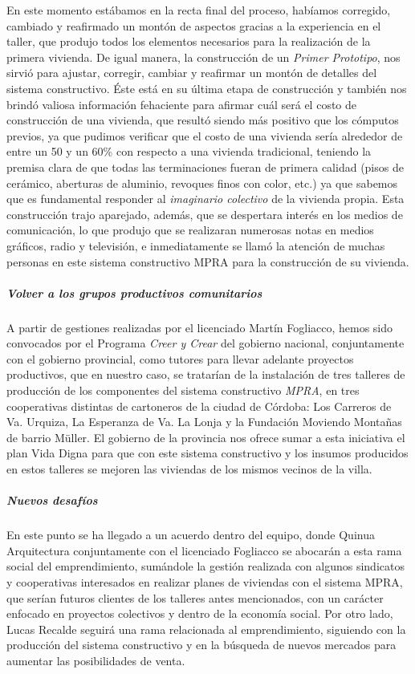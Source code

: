 \documentclass[
]{article}
\begin{document}
En este momento estábamos en la recta final del proceso, habíamos
corregido, cambiado y reafirmado un montón de aspectos gracias a la
experiencia en el taller, que produjo todos los elementos necesarios
para la realización de la primera vivienda. De igual manera, la
construcción de un \emph{Primer Prototipo}, nos sirvió para ajustar,
corregir, cambiar y reafirmar un montón de detalles del sistema
constructivo. Éste está en su última etapa de construcción y también nos
brindó valiosa información fehaciente para afirmar cuál será el costo de
construcción de una vivienda, que resultó siendo más positivo que los
cómputos previos, ya que pudimos verificar que el costo de una vivienda
sería alrededor de entre un 50 y un 60\% con respecto a una vivienda
tradicional, teniendo la premisa clara de que todas las terminaciones
fueran de primera calidad (pisos de cerámico, aberturas de aluminio,
revoques finos con color, etc.) ya que sabemos que es fundamental
responder al \emph{imaginario colectivo} de la vivienda propia. Esta
construcción trajo aparejado, además, que se despertara interés en los
medios de comunicación, lo que produjo que se realizaran numerosas notas
en medios gráficos, radio y televisión, e inmediatamente se llamó la
atención de muchas personas en este sistema constructivo MPRA para la
construcción de su vivienda.

\hypertarget{volver-a-los-grupos-productivos-comunitarios}{%
\subparagraph{Volver a los grupos productivos
comunitarios}\label{volver-a-los-grupos-productivos-comunitarios}}

A partir de gestiones realizadas por el licenciado Martín Fogliacco,
hemos sido convocados por el Programa \emph{Creer y Crear} del gobierno
nacional, conjuntamente con el gobierno provincial, como tutores para
llevar adelante proyectos productivos, que en nuestro caso, se tratarían
de la instalación de tres talleres de producción de los componentes del
sistema constructivo \emph{MPRA}, en tres cooperativas distintas de
cartoneros de la ciudad de Córdoba: Los Carreros de Va. Urquiza, La
Esperanza de Va. La Lonja y la Fundación Moviendo Montañas de barrio
Müller. El gobierno de la provincia nos ofrece sumar a esta iniciativa
el plan Vida Digna para que con este sistema constructivo y los insumos
producidos en estos talleres se mejoren las viviendas de los mismos
vecinos de la villa.

\hypertarget{nuevos-desafuxedos}{%
\subparagraph{Nuevos desafíos}\label{nuevos-desafuxedos}}

En este punto se ha llegado a un acuerdo dentro del equipo, donde Quinua
Arquitectura conjuntamente con el licenciado Fogliacco se abocarán a
esta rama social del emprendimiento, sumándole la gestión realizada con
algunos sindicatos y cooperativas interesados en realizar planes de
viviendas con el sistema MPRA, que serían futuros clientes de los
talleres antes mencionados, con un carácter enfocado en proyectos
colectivos y dentro de la economía social. Por otro lado, Lucas Recalde
seguirá una rama relacionada al emprendimiento, siguiendo con la
producción del sistema constructivo y en la búsqueda de nuevos mercados
para aumentar las posibilidades de venta.
\end{document}
